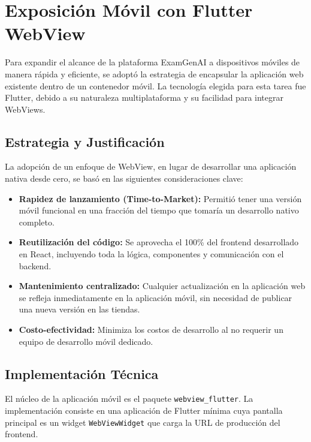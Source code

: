 \documentclass[12pt,a4paper]{report}
\begin{document}
\chapter{Exposición Móvil con Flutter WebView}
\label{chap:flutter_webview}

Para expandir el alcance de la plataforma ExamGenAI a dispositivos móviles de manera rápida y eficiente, se adoptó la estrategia de encapsular la aplicación web existente dentro de un contenedor móvil. La tecnología elegida para esta tarea fue Flutter, debido a su naturaleza multiplataforma y su facilidad para integrar WebViews.

\section{Estrategia y Justificación}

La adopción de un enfoque de WebView, en lugar de desarrollar una aplicación nativa desde cero, se basó en las siguientes consideraciones clave:

\begin{itemize}
    \item \textbf{Rapidez de lanzamiento (Time-to-Market):} Permitió tener una versión móvil funcional en una fracción del tiempo que tomaría un desarrollo nativo completo.
    \item \textbf{Reutilización del código:} Se aprovecha el 100\% del frontend desarrollado en React, incluyendo toda la lógica, componentes y comunicación con el backend.
    \item \textbf{Mantenimiento centralizado:} Cualquier actualización en la aplicación web se refleja inmediatamente en la aplicación móvil, sin necesidad de publicar una nueva versión en las tiendas.
    \item \textbf{Costo-efectividad:} Minimiza los costos de desarrollo al no requerir un equipo de desarrollo móvil dedicado.
\end{itemize}

\section{Implementación Técnica}

El núcleo de la aplicación móvil es el paquete \texttt{webview\_flutter}. La implementación consiste en una aplicación de Flutter mínima cuya pantalla principal es un widget \texttt{WebViewWidget} que carga la URL de producción del frontend.
\end{document}
